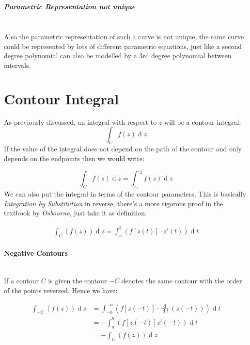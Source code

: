 \documentclass[class=article, crop=false]{standalone}
\begin{document}
\subparagraph{Parametric Representation not unique}\ \\
Also the parametric representation of such a curve is not unique, the same curve could be represented by lots of different parametric equations, just like a second degree polynomial can also be modelled by a 3rd degree polynomial between intervals.

\newpage


\section{Contour Integral}
As previously discussed, an integral with respect to $z$ will be a contour integral:
\[
\int^{}_{C} f \left(z \right)   \operatorname{d}z 
\]
If the value of the integral does not depend on the path of the contour and only depends on the endpoints then we would write:

\[
\int^{}_{C} f \left(z \right)   \operatorname{d}z = \int^{z_2}_{z_1} f\left( z   \right) \operatorname{d}z 
\]
We can also put the integral in terms of the contour parameters, This is basically \textit{Integration by Substitution} in reverse, there's a more rigorous proof in the textbook by \textit{Osbourne}, just take it as definition.

  \begin{align}
    \int^{}_{C}\left( f\left( z \right)  \right) \operatorname{d}z = \int^{b}_{a}\left(f \left[ z\left( t \right)  \right]\cdot  z'\left( t \right)  \right) \operatorname{d}t  
    \label{tdef}
  \end{align}
  
\paragraph{Negative Contours}\ \\
If a contour $C$ is given the contour $- C$ denotes the same contour with the order of the points reversed.
Hence we have:

\begin{align*}
\int^{}_{-C}\left( f\left( z \right)  \right) \operatorname{d}z  &= \int^{- a}_{- b}\left( f\left[ z\left( - t \right)  \right] \cdot \frac{\operatorname{d} }{\operatorname{d} t}\left( z\left( - t \right)  \right)  \right) \operatorname{d}t \\
    &= - \int^{b}_{a}\left( f\left[ z\left( - t \right)  \right] z'\left( - t \right)  \right) \operatorname{d}t \\
    &= - \int^{}_{C}\left( f\left( z \right)  \right) \operatorname{d}z 
\end{align*}
\end{document}
